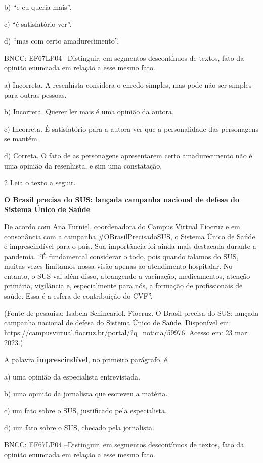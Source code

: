 b) ``e eu queria mais''.

c) ``é satisfatório ver''.

d) ``mas com certo amadurecimento''.

BNCC: EF67LP04 --Distinguir, em segmentos descontínuos de textos, fato
da opinião enunciada em relação a esse mesmo fato.

a) Incorreta. A resenhista considera o enredo simples, mas pode não ser
simples para outras pessoas.

b) Incorreta. Querer ler mais é uma opinião da autora.

c) Incorreta. É satisfatório para a autora ver que a personalidade das
personagens se mantém.

d) Correta. O fato de as personagens apresentarem certo amadurecimento
não é uma opinião da resenhista, e sim uma constatação.

\num{2} Leia o texto a seguir.

\textbf{O Brasil precisa do SUS: lançada campanha nacional de defesa do
Sistema Único de Saúde}

De acordo com Ana Furniel, coordenadora do Campus Virtual Fiocruz e em
consonância com a campanha \#OBrasilPrecisadoSUS, o Sistema Único de
Saúde é imprescindível para o país. Sua importância foi ainda mais
destacada durante a pandemia. ``É fundamental considerar o todo, pois
quando falamos do SUS, muitas vezes limitamos nossa visão apenas ao
atendimento hospitalar. No entanto, o SUS vai além disso, abrangendo a
vacinação, medicamentos, atenção primária, vigilância e, especialmente
para nós, a formação de profissionais de saúde. Essa é a esfera de
contribuição do CVF''.

(Fonte de pesauisa: Isabela Schincariol. Fiocruz. O Brasil precisa do
SUS: lançada campanha nacional de defesa do Sistema Único de Saúde.
Disponível em: 
\url{https://campusvirtual.fiocruz.br/portal/?q=noticia/59976}.
Acesso em: 23 mar. 2023.)

A palavra \textbf{imprescindível}, no primeiro parágrafo, é

a) uma opinião da especialista entrevistada.

b) uma opinião da jornalista que escreveu a matéria.

c) um fato sobre o SUS, justificado pela especialista.

d) um fato sobre o SUS, checado pela jornalista.

BNCC: EF67LP04 --Distinguir, em segmentos descontínuos de textos, fato
da opinião enunciada em relação a esse mesmo fato.

